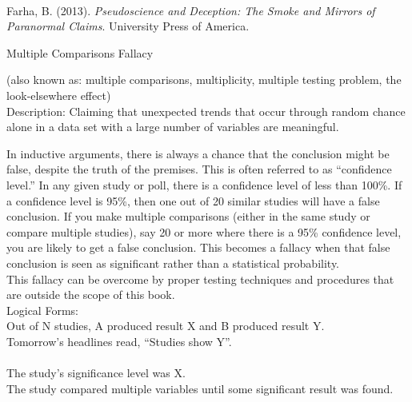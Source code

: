 \documentclass[a4paper,12pt,single,pdftex]{scrartcl}
\begin{document}
        
      \\

      
        
          Farha, B. (2013). {\it Pseudoscience and Deception: The Smoke and Mirrors of Paranormal Claims}. University Press of America.
        
      
    
  

Multiple Comparisons Fallacy
    
      (also known as: multiple comparisons, multiplicity, multiple testing problem, the look-elsewhere effect)
    \\

  
    Description: Claiming that unexpected trends that occur through random chance alone in a data set with a large number of variables are meaningful.

    
      In inductive arguments, there is always a chance that the conclusion might be false, despite the truth of the premises. This is often referred to as “confidence level.” In any given study or poll, there is a confidence level of less than 100\%. If a confidence level is 95\%, then one out of 20 similar studies will have a false conclusion. If you make multiple comparisons (either in the same study or compare multiple studies), say 20 or more where there is a 95\% confidence level, you are likely to get a false conclusion. This becomes a fallacy when that false conclusion is seen as significant rather than a statistical probability.
    \\

    
      This fallacy can be overcome by proper testing techniques and procedures that are outside the scope of this book.
    \\

    
      Logical Forms:
    \\

    
      Out of N studies, A produced result X and B produced result Y.
    \\

    
      Tomorrow’s headlines read, “Studies show Y”.
    \\

    
      
    \\

    
      The study’s significance level was X.
    \\

    
      The study compared multiple variables until some significant result was found.
    \\
\end{document}
